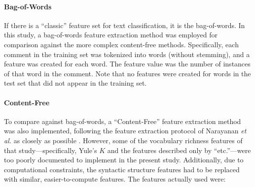 \documentclass{article}
\begin{document}
\paragraph{Bag-of-Words}
If there is a ``classic'' feature set for text classification, it is the bag-of-words. In this study, a bag-of-words feature extraction method was employed for comparison against the more complex content-free methods. Specifically, each comment in the training set was tokenized into words (without stemming), and a feature was created for each word. The feature value was the number of instances of that word in the comment. Note that no features were created for words in the test set that did not appear in the training set. 

\paragraph{Content-Free}
To compare against bag-of-words, a ``Content-Free'' feature extraction method was also implemented, following the feature extraction protocol of Narayanan \textit{et al.} as closely as possible \cite{narayanan2012feasibility}. However, some of the vocabulary richness features of that study---specifically, Yule's $K$ and the features described only by ``etc.''---were too poorly documented to implement in the present study. Additionally, due to computational constraints, the syntactic structure features had to be replaced with similar, easier-to-compute features. The features actually used were:
\end{document}
